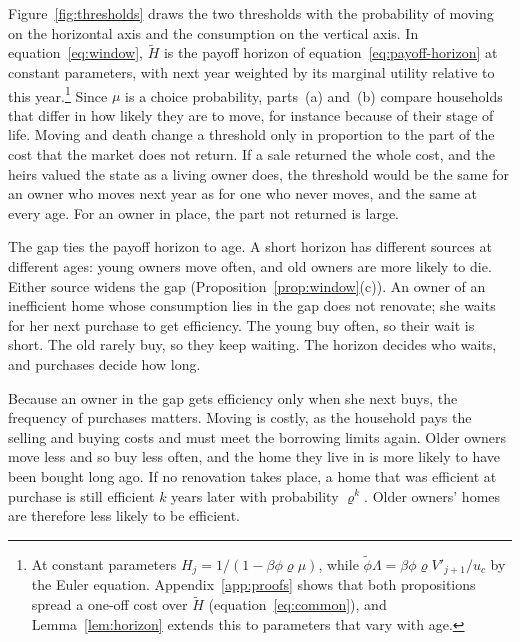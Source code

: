 Figure~\ref{fig:thresholds} draws the two thresholds with the probability of moving on the horizontal axis and the consumption on the vertical axis. In
equation~\eqref{eq:window}, $\widetilde H$ is the payoff horizon of
equation~\eqref{eq:payoff-horizon} at constant parameters, with next year
weighted by its marginal utility relative to this year.\footnote{At
constant parameters $H_j=1/(1-\beta\phi\varrho\mu)$, while
$\tilde\phi\Lambda=\beta\phi\varrho V'_{j+1}/u_c$ by the Euler equation.
Appendix~\ref{app:proofs} shows that both propositions spread a one-off
cost over $\widetilde H$ (equation~\eqref{eq:common}), and
Lemma~\ref{lem:horizon} extends this to parameters that vary with age.}
Since $\mu$ is a choice probability, parts~(a) and~(b) compare households that
differ in how likely they are to move, for instance because of their stage of
life. Moving and death change a threshold only in
proportion to the part of the cost that the market does not return. If a
sale returned the whole cost, and the heirs valued the state as a living
owner does, the threshold would be the same for an owner who moves next
year as for one who never moves, and the same at every age. For an owner
in place, the part not returned is large.

 The gap ties the payoff horizon to age. A short horizon has
different sources at different ages: young owners move often, and old
owners are more likely to die. Either source widens the gap
(Proposition~\ref{prop:window}(c)). An owner of an inefficient home whose
consumption lies in the gap does not renovate; she waits for her next
purchase to get efficiency. The young buy often, so their wait is short.
The old rarely buy, so they keep waiting. The horizon decides who waits,
and purchases decide how long.

Because an owner in the gap gets efficiency only when she next
buys, the frequency of purchases matters. Moving is costly, as the household pays the
selling and buying costs and must meet the borrowing limits again. Older
owners move less and so buy less often, and the home they live in is
more likely to have been bought long ago. If no renovation takes place, a home that was
efficient at purchase is still efficient $k$ years later with probability
$\varrho^k$. Older owners' homes are therefore less likely to be efficient. 

